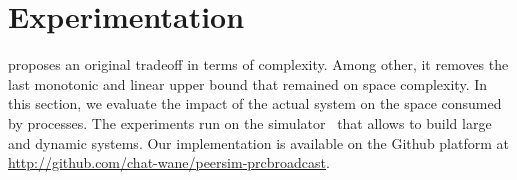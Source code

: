 
\section{Experimentation}
\label{sec:experimentation}

\RPCBROADCAST proposes an original tradeoff in terms of complexity. Among other,
it removes the last monotonic and linear upper bound that remained on space
complexity. In this section, we evaluate the impact of the actual system on the
space consumed by processes. The experiments run on the \PEERSIM
simulator~\cite{montresor2009peersim} that allows to build large and dynamic
systems. Our implementation is available on the Github platform at
\url{http://github.com/chat-wane/peersim-prcbroadcast}.


%   



